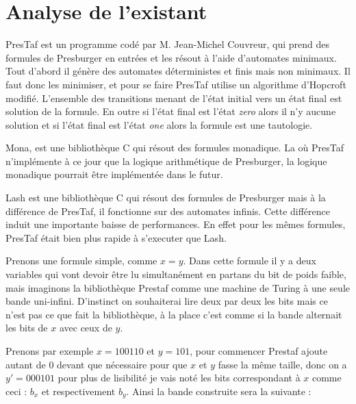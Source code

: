 \section{Analyse de l'existant}

PresTaf est un programme codé par M. Jean-Michel Couvreur, qui prend des formules de Presburger en entrées et les résout à l'aide d'automates minimaux. Tout d'abord il génère des automates déterministes et finis mais non minimaux. Il faut donc les minimiser, et pour se faire PresTaf utilise un algorithme d'Hopcroft modifié. L'ensemble des transitions menant de l'état initial vers un état final est solution de la formule. En outre si l'état final est l'état \emph{zero} alors il n'y aucune solution et si l'état final est l'état \emph{one} alors la formule est une tautologie.\\\par

Mona, est une bibliothèque C qui résout des formules monadique. La où PresTaf n'implémente à ce jour que la logique arithmétique de Presburger, la logique monadique pourrait être implémentée dans le futur.\\\par

Lash\cite{lash} est une bibliothèque C qui résout des formules de Presburger mais à la différence de PresTaf, il fonctionne sur des automates infinis. Cette différence induit une importante baisse de performances. En effet pour les mêmes formules, PresTaf était bien plus rapide à s'executer que Lash\cite{DBLP:conf/wia/Couvreur04}.\\\par

Prenons une formule simple, comme $x = y$. Dans cette formule il y a deux variables qui vont devoir être lu simultanément en partans du bit de poids faible, mais imaginons la bibliothèque Prestaf comme une machine de Turing à une seule bande uni-infini. D'instinct on souhaiterai lire deux par deux les bits mais ce n'est pas ce que fait la bibliothèque, à la place c'est comme si la bande alternait les bits de $x$ avec ceux de $y$.\\\par
Prenons par exemple $x = 100110$ et $y = 101$, pour commencer Prestaf ajoute autant de 0 devant que nécessaire pour que $x$ et $y$ fasse la même taille, donc on a $y'=000101$ pour plus de lisibilité je vais noté les bits correspondant à $x$ comme ceci : $b_x$ et respectivement $b_y$. Ainsi la bande construite sera la suivante :

